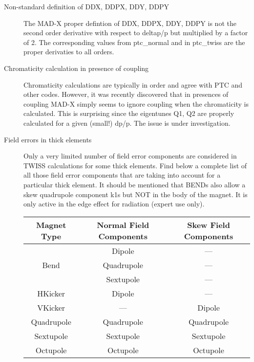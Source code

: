 \begin{description}
   \item[Non-standard definition of DDX, DDPX, DDY, DDPY] 
   The MAD-X proper defintion of DDX, DDPX, DDY, DDPY is not the     second
   order derivative with respect to deltap/p but multiplied by     a factor
   of 2. The corresponding values from ptc\_normal and in     ptc\_twiss
   are the proper derivaties to all orders.  


   \item[Chromaticity calculation in presence of coupling] 
   Chromaticity calculations are typically in order and agree with     PTC
   and other codes. However, it was recently discovered that in
   presences of coupling MAD-X simply seems to ignore coupling when     the
   chromaticity is calculated. This is surprising since the     eigentunes
   Q1, Q2 are properly calculated for a given (small!)     dp/p. The issue
   is under investigation.  


   \item[Field errors in thick elements]
   Only a very limited number of field error components are
   considered in TWISS calculations for some thick elements. Find below
   a complete list of all those field error components that
   are taking into account for a particular thick element. It
   should be mentioned that BENDs also allow a skew quadrupole
   component k1s but NOT in the body of the magnet. It is only
   active in the edge effect for radiation (expert use only). 


{\renewcommand{\arraystretch}{2}
  \begin{tabular}{c | c | c}
    \hline 
    \textbf{Magnet Type} & \textbf{Normal Field Components} & \textbf{Skew Field Components} \\ 
    \hline
    & Dipole & ---\\
    Bend & Quadrupole & ---\\
    & Sextupole & ---\\
    \hline
    HKicker & Dipole & ---\\
    \hline
    VKicker & --- & Dipole\\
    \hline
    Quadrupole & Quadrupole & Quadrupole \\
    \hline
    Sextupole & Sextupole & Sextupole \\
    \hline
    Octupole & Octupole & Octupole \\
    \hline
  \end{tabular}
}


\end{description}
